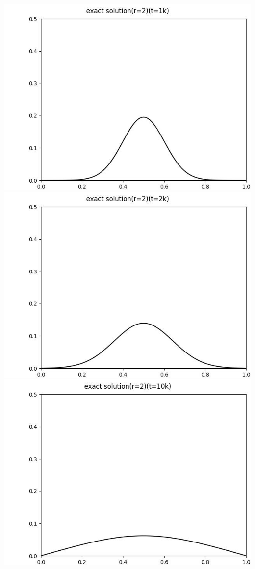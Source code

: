 \documentclass[12pt]{ctexart}
\begin{document}
\includegraphics[scale=0.35]{exact solution(r=2)(t=1k).jpg}
\includegraphics[scale=0.35]{exact solution(r=2)(t=2k).jpg}
\includegraphics[scale=0.35]{exact solution(r=2)(t=10k).jpg}
\end{document}
